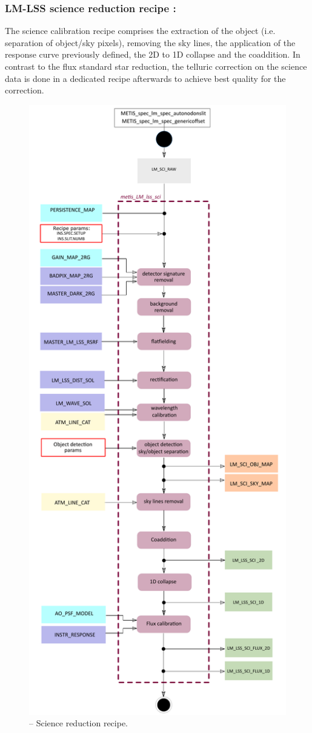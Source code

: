 \subsubsection{LM-LSS science reduction recipe :}
The science calibration recipe comprises the extraction of the object (i.e. separation of object/sky pixels), removing the sky lines, the application of the response curve previously defined, the 2D to 1D collapse and the coaddition. In contrast to the flux standard star reduction, the telluric correction on the science data is done in a dedicated recipe afterwards to achieve best quality for the correction.
\begin{figure}[ht]
  \centering
  \includegraphics[width=0.4\textheight]{figures/metis_lm_lss_sci_v0.71.pdf}
  \caption[Recipe: ]{ --
    Science reduction recipe.}
  \label{Fig:rec_lm_lss_sci}
\end{figure}
